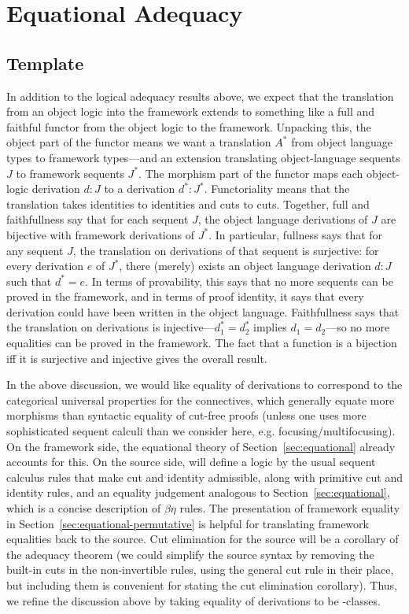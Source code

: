 \section{Equational Adequacy}
\label{sec:adequacy-equational}

\subsection{Template}

In addition to the logical adequacy results above, we expect that the
translation from an object logic into the framework extends to something
like a full and faithful functor from the object logic to the framework.
Unpacking this, the object part of the functor means we want a
translation $A^*$ from object language types to framework types---and an
extension translating object-language sequents $J$ to framework sequents
$J^*$.  The morphism part of the functor maps each object-logic
derivation $d : J$ to a derivation $d^* : J^*$.  Functoriality means
that the translation takes identities to identities and cuts to cuts.
Together, full and faithfullness say that for each sequent $J$, the
object language derivations of $J$ are bijective with framework
derivations of $J^*$.  In particular, fullness says that for any sequent
$J$, the translation on derivations of that sequent is surjective: for
every derivation $e$ of $J^*$, there (merely) exists an object language
derivation $d : J$ such that $d^* = e$.  In terms of provability, this
says that no more sequents can be proved in the framework, and in terms
of proof identity, it says that every derivation could have been written
in the object language. Faithfullness says that the translation on
derivations is injective---$d_1^* = d_2^*$ implies $d_1 = d_2$---so no
more equalities can be proved in the framework.  The fact that a
function is a bijection iff it is surjective and injective gives the
overall result.

In the above discussion, we would like equality of derivations to
correspond to the categorical universal properties for the connectives,
which generally equate more morphisms than syntactic equality of
cut-free proofs (unless one uses more sophisticated sequent calculi than
we consider here, e.g. focusing/multifocusing).  On the framework side,
the equational theory of Section~\ref{sec:equational} already accounts
for this.  On the source side, will define a logic by the usual sequent
calculus rules that make cut and identity admissible, along with
primitive cut and identity rules, and an equality judgement analogous to
Section~\ref{sec:equational}, which is a concise description of
$\beta\eta$ rules.  The presentation of framework equality in
Section~\ref{sec:equational-permutative} is helpful for translating
framework equalities back to the source.  Cut elimination for the source
will be a corollary of the adequacy theorem (we could simplify the
source syntax by removing the built-in cuts in the non-invertible rules,
using the general cut rule in their place, but including them is
convenient for stating the cut elimination corollary).  Thus, we refine
the discussion above by taking equality of derivations to be
\deq-classes.

